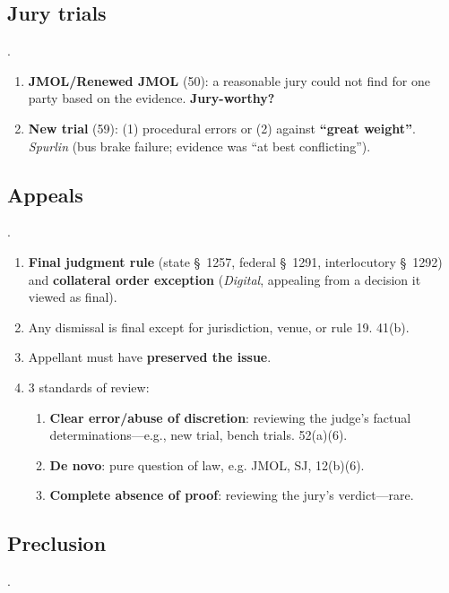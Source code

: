 \subsection{Jury trials}.

\begin{enumerate}
    \item \textbf{JMOL/Renewed JMOL} (50): a reasonable jury could not find 
    for one party based on the evidence. \textbf{Jury-worthy?}
    \item \textbf{New trial} (59): (1) procedural errors or (2) against 
    \textbf{``great weight''}. \emph{Spurlin} (bus brake failure; evidence was 
    ``at best conflicting'').
\end{enumerate}

\subsection{Appeals}.

\begin{enumerate}
    \item \textbf{Final judgment rule} (state \S\ 1257, federal \S\ 1291, 
    interlocutory \S\ 1292) and \textbf{collateral order exception} 
    (\emph{Digital}, appealing from a decision it viewed as final).
    \item Any dismissal is final except for jurisdiction, venue, or rule 19.  
    41(b).
    \item Appellant must have \textbf{preserved the issue}.
    \item 3 standards of review:
    \begin{enumerate}
        \item \textbf{Clear error/abuse of discretion}: reviewing the judge's 
        factual determinations---e.g., new trial, bench trials. 52(a)(6).
        \item \textbf{De novo}: pure question of law, e.g. JMOL, SJ, 12(b)(6).
        \item \textbf{Complete absence of proof}: reviewing the jury's 
        verdict---rare.
    \end{enumerate}
\end{enumerate}

\subsection{Preclusion}.

